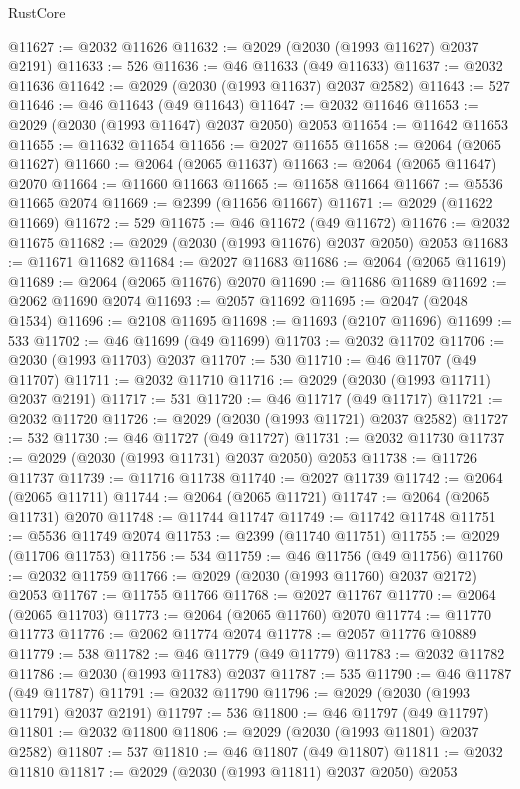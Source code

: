 \begin{lexlean}{RustCore}
\begin{coremodule}
@11627 := @2032 @11626
@11632 := @2029 (@2030 (@1993 @11627) @2037 @2191)
@11633 := 526
@11636 := @46 @11633 (@49 @11633)
@11637 := @2032 @11636
@11642 := @2029 (@2030 (@1993 @11637) @2037 @2582)
@11643 := 527
@11646 := @46 @11643 (@49 @11643)
@11647 := @2032 @11646
@11653 := @2029 (@2030 (@1993 @11647) @2037 @2050) @2053
@11654 := @11642 @11653
@11655 := @11632 @11654
@11656 := @2027 @11655
@11658 := @2064 (@2065 @11627)
@11660 := @2064 (@2065 @11637)
@11663 := @2064 (@2065 @11647) @2070
@11664 := @11660 @11663
@11665 := @11658 @11664
@11667 := @5536 @11665 @2074
@11669 := @2399 (@11656 @11667)
@11671 := @2029 (@11622 @11669)
@11672 := 529
@11675 := @46 @11672 (@49 @11672)
@11676 := @2032 @11675
@11682 := @2029 (@2030 (@1993 @11676) @2037 @2050) @2053
@11683 := @11671 @11682
@11684 := @2027 @11683
@11686 := @2064 (@2065 @11619)
@11689 := @2064 (@2065 @11676) @2070
@11690 := @11686 @11689
@11692 := @2062 @11690 @2074
@11693 := @2057 @11692
@11695 := @2047 (@2048 @1534)
@11696 := @2108 @11695
@11698 := @11693 (@2107 @11696)
@11699 := 533
@11702 := @46 @11699 (@49 @11699)
@11703 := @2032 @11702
@11706 := @2030 (@1993 @11703) @2037
@11707 := 530
@11710 := @46 @11707 (@49 @11707)
@11711 := @2032 @11710
@11716 := @2029 (@2030 (@1993 @11711) @2037 @2191)
@11717 := 531
@11720 := @46 @11717 (@49 @11717)
@11721 := @2032 @11720
@11726 := @2029 (@2030 (@1993 @11721) @2037 @2582)
@11727 := 532
@11730 := @46 @11727 (@49 @11727)
@11731 := @2032 @11730
@11737 := @2029 (@2030 (@1993 @11731) @2037 @2050) @2053
@11738 := @11726 @11737
@11739 := @11716 @11738
@11740 := @2027 @11739
@11742 := @2064 (@2065 @11711)
@11744 := @2064 (@2065 @11721)
@11747 := @2064 (@2065 @11731) @2070
@11748 := @11744 @11747
@11749 := @11742 @11748
@11751 := @5536 @11749 @2074
@11753 := @2399 (@11740 @11751)
@11755 := @2029 (@11706 @11753)
@11756 := 534
@11759 := @46 @11756 (@49 @11756)
@11760 := @2032 @11759
@11766 := @2029 (@2030 (@1993 @11760) @2037 @2172) @2053
@11767 := @11755 @11766
@11768 := @2027 @11767
@11770 := @2064 (@2065 @11703)
@11773 := @2064 (@2065 @11760) @2070
@11774 := @11770 @11773
@11776 := @2062 @11774 @2074
@11778 := @2057 @11776 @10889
@11779 := 538
@11782 := @46 @11779 (@49 @11779)
@11783 := @2032 @11782
@11786 := @2030 (@1993 @11783) @2037
@11787 := 535
@11790 := @46 @11787 (@49 @11787)
@11791 := @2032 @11790
@11796 := @2029 (@2030 (@1993 @11791) @2037 @2191)
@11797 := 536
@11800 := @46 @11797 (@49 @11797)
@11801 := @2032 @11800
@11806 := @2029 (@2030 (@1993 @11801) @2037 @2582)
@11807 := 537
@11810 := @46 @11807 (@49 @11807)
@11811 := @2032 @11810
@11817 := @2029 (@2030 (@1993 @11811) @2037 @2050) @2053

\end{coremodule}
\end{lexlean}
